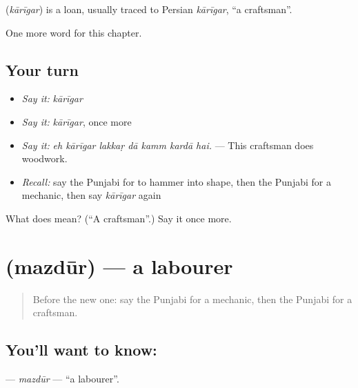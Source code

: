 \begin{cousinweb}
\textbf{} (\emph{kārīgar}) is a loan, usually traced to Persian \emph{kārīgar}, \textquotedblleft{}a craftsman\textquotedblright{}.
\end{cousinweb}

\begin{grammarlens}[title={What you've built}]
One more word for this chapter.
\end{grammarlens}

\subsection*{Your turn}
\begin{itemize}
\raggedright
  \item \emph{Say it:} \emph{kārīgar}
  \item \emph{Say it:} \emph{kārīgar}, once more
  \item \emph{Say it:} \emph{eh kārīgar lakkaṛ dā kamm kardā hai.} — This craftsman does woodwork.
  \item \emph{Recall:} say the Punjabi for to hammer into shape, then the Punjabi for a mechanic, then say \emph{kārīgar} again
\end{itemize}

\begin{tcolorbox}[breakable,colback=teal!4,colframe=teal!35!black,title={Before you move on}]
What does  mean? (\textquotedblleft{}A craftsman\textquotedblright{}.) Say it once more.
\end{tcolorbox}
\section[\texorpdfstring{\pa{ਮਜ਼ਦੂਰ} (mazdūr)}{ਮਜ਼ਦੂਰ (mazdūr)}]{ (mazdūr) — a labourer}

\label{lesson:PA-C336-mazdur}



\begin{quote}
Before the new one: say the Punjabi for a mechanic, then the Punjabi for a craftsman.
\end{quote}

\subsection*{You'll want to know: }
\textbf{} — \emph{mazdūr} — \textquotedblleft{}a labourer\textquotedblright{}.

